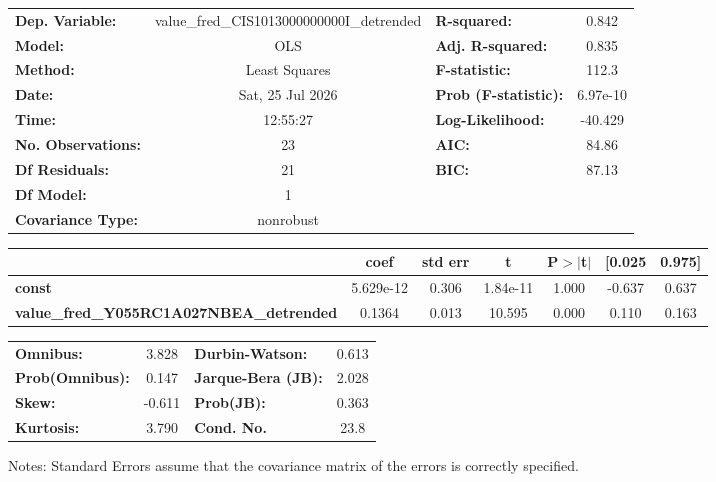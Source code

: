 \begin{center}
\begin{tabular}{lclc}
\toprule
\textbf{Dep. Variable:}                          & value\_fred\_CIS1013000000000I\_detrended & \textbf{  R-squared:         } &     0.842   \\
\textbf{Model:}                                  &                    OLS                    & \textbf{  Adj. R-squared:    } &     0.835   \\
\textbf{Method:}                                 &               Least Squares               & \textbf{  F-statistic:       } &     112.3   \\
\textbf{Date:}                                   &              Sat, 25 Jul 2026             & \textbf{  Prob (F-statistic):} &  6.97e-10   \\
\textbf{Time:}                                   &                  12:55:27                 & \textbf{  Log-Likelihood:    } &   -40.429   \\
\textbf{No. Observations:}                       &                       23                  & \textbf{  AIC:               } &     84.86   \\
\textbf{Df Residuals:}                           &                       21                  & \textbf{  BIC:               } &     87.13   \\
\textbf{Df Model:}                               &                        1                  & \textbf{                     } &             \\
\textbf{Covariance Type:}                        &                 nonrobust                 & \textbf{                     } &             \\
\bottomrule
\end{tabular}
\begin{tabular}{lcccccc}
                                                 & \textbf{coef} & \textbf{std err} & \textbf{t} & \textbf{P$> |$t$|$} & \textbf{[0.025} & \textbf{0.975]}  \\
\midrule
\textbf{const}                                   &    5.629e-12  &        0.306     &  1.84e-11  &         1.000        &       -0.637    &        0.637     \\
\textbf{value\_fred\_Y055RC1A027NBEA\_detrended} &       0.1364  &        0.013     &    10.595  &         0.000        &        0.110    &        0.163     \\
\bottomrule
\end{tabular}
\begin{tabular}{lclc}
\textbf{Omnibus:}       &  3.828 & \textbf{  Durbin-Watson:     } &    0.613  \\
\textbf{Prob(Omnibus):} &  0.147 & \textbf{  Jarque-Bera (JB):  } &    2.028  \\
\textbf{Skew:}          & -0.611 & \textbf{  Prob(JB):          } &    0.363  \\
\textbf{Kurtosis:}      &  3.790 & \textbf{  Cond. No.          } &     23.8  \\
\bottomrule
\end{tabular}
\end{center}

Notes: \newline
 [1] Standard Errors assume that the covariance matrix of the errors is correctly specified.